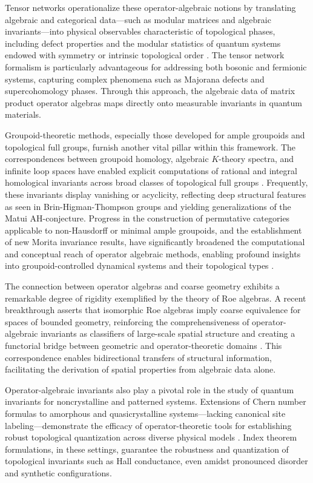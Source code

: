 \documentclass[sigconf]{acmart}
\begin{document}
Tensor networks operationalize these operator-algebraic notions by translating algebraic and categorical data—such as modular matrices and algebraic invariants—into physical observables characteristic of topological phases, including defect properties and the modular statistics of quantum systems endowed with symmetry or intrinsic topological order \cite{ref21}. The tensor network formalism is particularly advantageous for addressing both bosonic and fermionic systems, capturing complex phenomena such as Majorana defects and supercohomology phases. Through this approach, the algebraic data of matrix product operator algebras maps directly onto measurable invariants in quantum materials.

Groupoid-theoretic methods, especially those developed for ample groupoids and topological full groups, furnish another vital pillar within this framework. The correspondences between groupoid homology, algebraic $K$-theory spectra, and infinite loop spaces have enabled explicit computations of rational and integral homological invariants across broad classes of topological full groups \cite{ref22}. Frequently, these invariants display vanishing or acyclicity, reflecting deep structural features as seen in Brin-Higman-Thompson groups and yielding generalizations of the Matui AH-conjecture. Progress in the construction of permutative categories applicable to non-Hausdorff or minimal ample groupoids, and the establishment of new Morita invariance results, have significantly broadened the computational and conceptual reach of operator algebraic methods, enabling profound insights into groupoid-controlled dynamical systems and their topological types \cite{ref22,ref23}.

The connection between operator algebras and coarse geometry exhibits a remarkable degree of rigidity exemplified by the theory of Roe algebras. A recent breakthrough asserts that isomorphic Roe algebras imply coarse equivalence for spaces of bounded geometry, reinforcing the comprehensiveness of operator-algebraic invariants as classifiers of large-scale spatial structure and creating a functorial bridge between geometric and operator-theoretic domains \cite{ref34}. This correspondence enables bidirectional transfers of structural information, facilitating the derivation of spatial properties from algebraic data alone.

Operator-algebraic invariants also play a pivotal role in the study of quantum invariants for noncrystalline and patterned systems. Extensions of Chern number formulas to amorphous and quasicrystalline systems—lacking canonical site labeling—demonstrate the efficacy of operator-theoretic tools for establishing robust topological quantization across diverse physical models \cite{ref25}. Index theorem formulations, in these settings, guarantee the robustness and quantization of topological invariants such as Hall conductance, even amidst pronounced disorder and synthetic configurations.
\end{document}

